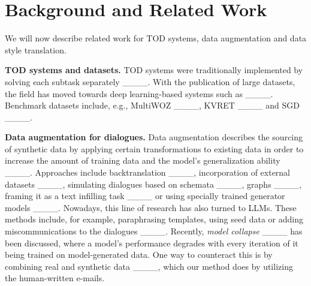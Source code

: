 \section{Background and Related Work}
We will now describe related work for TOD systems, data augmentation and data style translation.

\textbf{TOD systems and datasets.}
TOD systems were traditionally implemented by solving each subtask separately ____.
With the publication of large datasets, the field has moved towards deep learning-based systems such as ____.
Benchmark datasets include, e.g., MultiWOZ ____,
KVRET ____ and SGD ____.


\textbf{Data augmentation for dialogues.}
Data augmentation describes the sourcing of synthetic data by applying certain transformations to existing data in order to increase the amount of training data and the model's generalization ability ____.
Approaches include backtranslation ____, incorporation of external datasets ____, simulating dialogues based on schemata ____, graphs ____, framing it as a text infilling task ____ or using specially trained generator models ____.
Nowadays, this line of research has also turned to LLMs.
These methods include, for example, paraphrasing templates, using seed data or adding miscommunications to the dialogues
____.
Recently, \textit{model collapse} ____ has been discussed, where a model's performance degrades with every iteration of it being trained on model-generated data. 
One way to counteract this is by combining real and synthetic data ____, which our method does by utilizing the human-written e-mails.

